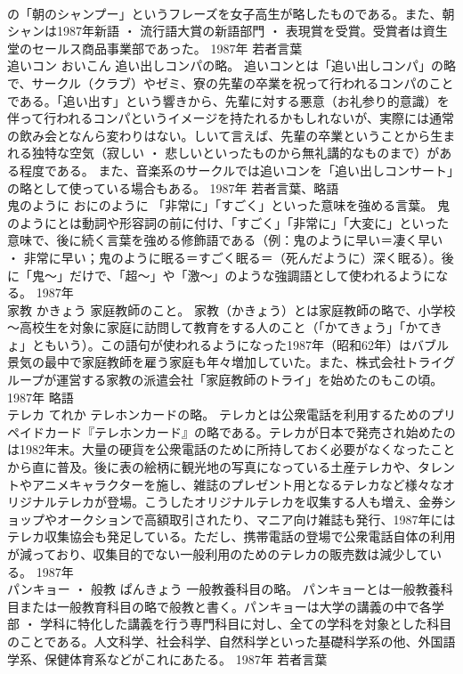 \documentclass[8pt]{extreport}
\begin{document}
\begin{CJK}{UTF8}{min}
\\	の「朝のシャンプー」というフレーズを女子高生が略したものである。また、朝シャンは1987年新語 ・ 流行語大賞の新語部門 ・ 表現賞を受賞。受賞者は資生堂のセールス商品事業部であった。	1987年	若者言葉	
\\	追いコン	おいこん	追い出しコンパの略。	追いコンとは「追い出しコンパ」の略で、サークル（クラブ）やゼミ、寮の先輩の卒業を祝って行われるコンパのことである。「追い出す」という響きから、先輩に対する悪意（お礼参り的意識）を伴って行われるコンパというイメージを持たれるかもしれないが、実際には通常の飲み会となんら変わりはない。しいて言えば、先輩の卒業ということから生まれる独特な空気（寂しい ・ 悲しいといったものから無礼講的なものまで）がある程度である。 また、音楽系のサークルでは追いコンを「追い出しコンサート」の略として使っている場合もある。	1987年	若者言葉、略語	
\\	鬼のように	おにのように	「非常に」「すごく」といった意味を強める言葉。	鬼のようにとは動詞や形容詞の前に付け、「すごく」「非常に」「大変に」といった意味で、後に続く言葉を強める修飾語である（例：鬼のように早い＝凄く早い ・ 非常に早い；鬼のように眠る＝すごく眠る＝（死んだように）深く眠る）。後に「鬼～」だけで、「超～」や「激～」のような強調語として使われるようになる。	1987年	
\\	家教	かきょう	家庭教師のこと。	家教（かきょう）とは家庭教師の略で、小学校～高校生を対象に家庭に訪問して教育をする人のこと（「かてきょう」「かてきょ」ともいう）。この語句が使われるようになった1987年（昭和62年）はバブル景気の最中で家庭教師を雇う家庭も年々増加していた。また、株式会社トライグループが運営する家教の派遣会社「家庭教師のトライ」を始めたのもこの頃。	1987年	略語	
\\	テレカ	てれか	テレホンカードの略。	テレカとは公衆電話を利用するためのプリペイドカード『テレホンカード』の略である。テレカが日本で発売され始めたのは1982年末。大量の硬貨を公衆電話のために所持しておく必要がなくなったことから直に普及。後に表の絵柄に観光地の写真になっている土産テレカや、タレントやアニメキャラクターを施し、雑誌のプレゼント用となるテレカなど様々なオリジナルテレカが登場。こうしたオリジナルテレカを収集する人も増え、金券ショップやオークションで高額取引されたり、マニア向け雑誌も発行、1987年にはテレカ収集協会も発足している。ただし、携帯電話の登場で公衆電話自体の利用が減っており、収集目的でない一般利用のためのテレカの販売数は減少している。	1987年	
\\	パンキョー ・ 般教	ぱんきょう	一般教養科目の略。	パンキョーとは一般教養科目または一般教育科目の略で般教と書く。パンキョーは大学の講義の中で各学部 ・ 学科に特化した講義を行う専門科目に対し、全ての学科を対象とした科目のことである。人文科学、社会科学、自然科学といった基礎科学系の他、外国語学系、保健体育系などがこれにあたる。	1987年	若者言葉	

\end{CJK}
\end{document}
